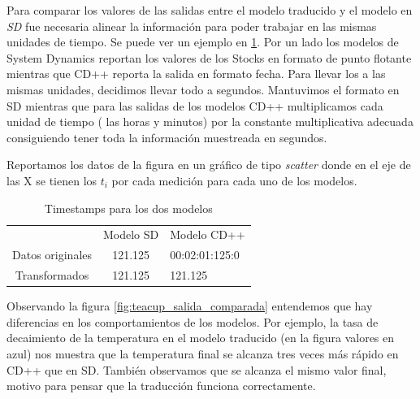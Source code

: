 Para comparar los valores de las salidas entre el modelo traducido y el modelo
en \textit{SD} fue necesaria alinear la información para poder trabajar en las
mismas unidades de tiempo. Se puede ver un ejemplo en \ref{tab:times}. Por un lado los modelos de System Dynamics reportan
los valores de los Stocks en formato de punto flotante mientras que CD++
reporta la salida en formato fecha. Para llevar los a las mismas unidades,
decidimos llevar todo a segundos. Mantuvimos el formato en SD mientras que para las salidas de los modelos CD++ multiplicamos cada unidad de tiempo ( las horas y minutos) por la constante multiplicativa adecuada consiguiendo tener toda la información muestreada en segundos.

Reportamos los datos de la figura en un gráfico de tipo \textit{scatter} donde en el eje de las X se tienen los $t_i$ por cada medición para cada uno de los modelos.

\begin{table}[H]
    \centering
    \label{tab:times}
    \begin{tabular}{c | c  l}
        & Modelo SD & Modelo CD++ \\
       Datos originales & 121.125 & 00:02:01:125:0 \\ 
        Transformados & 121.125 & 121.125
    \end{tabular}
    \caption{Timestamps para los dos modelos} 
\end{table}


Observando la figura \ref{fig:teacup_salida_comparada} entendemos que hay diferencias en los comportamientos de los modelos. Por ejemplo, la tasa de decaimiento de la temperatura en el modelo traducido (en la figura valores en azul) nos muestra que la temperatura final se alcanza tres veces más rápido en CD++ que en SD.
También observamos que se alcanza el mismo valor final, motivo para pensar que la traducción funciona correctamente.

\begin{figure}[H]
    \centering     %
\end{figure}

